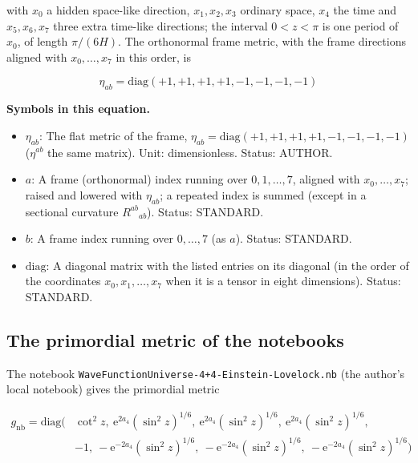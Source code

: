\documentclass[
  10pt,
]{article}
\providecommand{\tightlist}{%
  \setlength{\itemsep}{0pt}\setlength{\parskip}{0pt}}
\begin{document}
with \(x_0\) a hidden space-like direction, \(x_1, x_2, x_3\) ordinary
space, \(x_4\) the time and \(x_5, x_6, x_7\) three extra time-like
directions; the interval \(0 < z < \pi\) is one period of \(x_0\), of
length \(\pi/(6H)\). The orthonormal frame metric, with the frame
directions aligned with \(x_0, \dots, x_7\) in this order, is

\[
\eta_{ab} = \mathrm{diag}(+1, +1, +1, +1, -1, -1, -1, -1)
\]

\textbf{Symbols in this equation.}

\begin{itemize}
\tightlist
\item
  \(\eta_{ab}\): The flat metric of the frame,
  \(\eta_{ab} = \mathrm{diag}(+1, +1, +1, +1, -1, -1, -1, -1)\)
  (\(\eta^{ab}\) the same matrix). Unit: dimensionless. Status: AUTHOR.
\item
  \(a\): A frame (orthonormal) index running over \(0, 1, \dots, 7\),
  aligned with \(x_0, \dots, x_7\); raised and lowered with
  \(\eta_{ab}\); a repeated index is summed (except in a sectional
  curvature \(R^{ab}{}_{ab}\)). Status: STANDARD.
\item
  \(b\): A frame index running over \(0, \dots, 7\) (as \(a\)). Status:
  STANDARD.
\item
  \(\mathrm{diag}\): A diagonal matrix with the listed entries on its
  diagonal (in the order of the coordinates \(x_0, x_1, \dots, x_7\)
  when it is a tensor in eight dimensions). Status: STANDARD.
\end{itemize}

\hypertarget{the-primordial-metric-of-the-notebooks}{%
\subsection{The primordial metric of the
notebooks}\label{the-primordial-metric-of-the-notebooks}}

The notebook \texttt{WaveFunctionUniverse-4+4-Einstein-Lovelock.nb} (the
author's local notebook) gives the primordial metric

\[
\begin{aligned}
g_{\mathrm{nb}} = \mathrm{diag}\big(&\cot^2z,\ \mathrm{e}^{2a_4}(\sin^2z)^{1/6},\ \mathrm{e}^{2a_4}(\sin^2z)^{1/6},
 \ \mathrm{e}^{2a_4}(\sin^2z)^{1/6},\\
&-1,\ -\mathrm{e}^{-2a_4}(\sin^2z)^{1/6},\ -\mathrm{e}^{-2a_4}(\sin^2z)^{1/6},\ -\mathrm{e}^{-2a_4}(\sin^2z)^{1/6}\big)
\end{aligned}
\]
\end{document}
